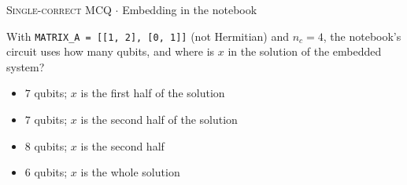 \documentclass[11pt,a4paper]{article}
\newcommand{\optlabel}[1]{\textbf{(#1)}}
\newcommand{\correctlabel}[1]{\textcolor{okgreen}{\textbf{(#1)}\,\ding{51}}}
\newenvironment{qitem}[1]{\begin{list}{}{\setlength{\leftmargin}{3.3em}\setlength{\labelwidth}{3.1em}%
  \setlength{\labelsep}{0.2em}\setlength{\topsep}{3pt}\setlength{\parsep}{3pt}}\item[\textbf{Q.#1}\hfill]}{\end{list}}
\newcommand{\qmeta}[2]{{\footnotesize\color{black!60}\textsc{#1} \;$\cdot$\; #2}\par}
\begin{document}
\begin{qitem}{66}
\qmeta{Single-correct MCQ}{Embedding in the notebook}
With \texttt{MATRIX\_A = [[1, 2], [0, 1]]} (not Hermitian) and $n_c = 4$, the notebook's circuit uses how many qubits, and where is $x$ in the solution of the embedded system?
\begin{itemize}[leftmargin=2.6em, labelsep=0.4em, itemsep=2pt, topsep=3pt]
\item[\optlabel{A}] $7$ qubits; $x$ is the first half of the solution
\item[\correctlabel{B}] $7$ qubits; $x$ is the second half of the solution
\item[\optlabel{C}] $8$ qubits; $x$ is the second half
\item[\optlabel{D}] $6$ qubits; $x$ is the whole solution
\end{itemize}
\end{qitem}
\end{document}
